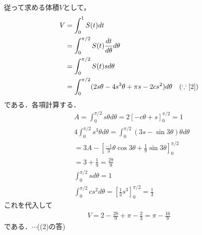 \documentclass[a4j]{jarticle}
\begin{document}
\begin{multicols}{2}
従って求める体積$V$として，
     \begin{align*}
     V&=\int_0^1S(t)dt \\
     &=\int_0^{\pi/2}S(t)\frac{dt}{d\theta}d\theta \\
     &=\int_0^{\pi/2}S(t)sd\theta \\
     &=\int_0^{\pi/2}(2s\theta-4s^3\theta+\pi s-2cs^2)d\theta &\left(\because\eqref{2}\right)
     \end{align*}
である．各項計算する．
     \begin{align*}
     &A=\int_0^{\pi/2}s\theta d\theta=2\left[-c\theta+s\right]_0^{\pi/2}=1 \\
     &4\int_0^{\pi/2}s^3\theta d\theta=\int_0^{\pi/2}(3s-\sin3\theta)\theta d\theta \\
     &=3A-\left[\frac{-1}{3}\theta\cos3\theta+\frac{1}{9}\sin3\theta\right]_0^{\pi/2} \\
     &=3+\frac{1}{9}=\frac{28}{9} \\
     &\int_0^{\pi/2}sd\theta=1 \\
     &\int_0^{\pi/2}cs^2d\theta=\left[\frac{1}{3}s^3\right]_0^{\pi/2}=\frac{1}{3}
     \end{align*}
これを代入して
     \begin{align*}
     V=2-\frac{28}{9}+\pi-\frac{2}{3}=\pi-\frac{16}{9}
     \end{align*}     
である．$\cdots$((2)の答)     
         
\newpage
\end{multicols}
\end{document}
